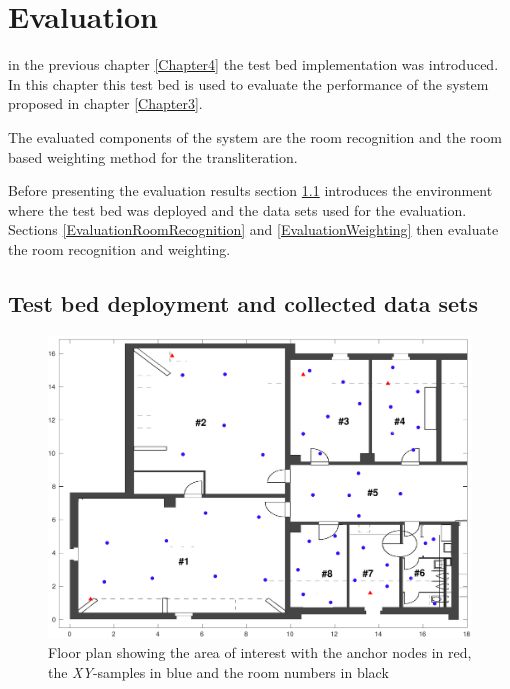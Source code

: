 \chapter{Evaluation}
\newcommand{\rd}[1]{\textcolor{red}{#1}}
\newcommand{\gn}[1]{\textcolor{green}{#1}}

\label{Chapter5}

in the previous chapter \ref{Chapter4} the test bed implementation was introduced. In this chapter this test bed is used to evaluate the performance of the system proposed in chapter \ref{Chapter3}.

The evaluated components of the system are the room recognition and the room based weighting method for the transliteration.

Before presenting the evaluation results section \ref{TestBedDeployment} introduces the environment where the test bed was deployed and the data sets used for the evaluation. Sections \ref{EvaluationRoomRecognition} and \ref{EvaluationWeighting} then evaluate the room recognition and weighting.

\section{Test bed deployment and collected data sets}
\label{TestBedDeployment}

\begin{figure}[ht]
\centering
\includegraphics[width=\textwidth]{Figures/FloorPlan_ANs}
\decoRule
\caption[Floor plan with anchor node placement]{Floor plan showing the area of interest with the anchor nodes in red, the \emph{XY}-samples in blue and the room numbers in black}
\label{fig:FloorPlanANs}
\end{figure}

